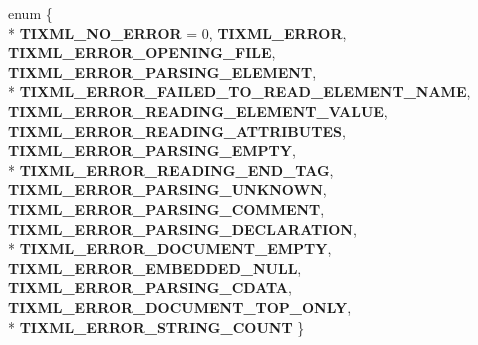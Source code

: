 \begin{DoxyCompactItemize}
\item 
\hypertarget{class_ti_xml_base_a86bc897e86b25d1a668fecef70be671c}{enum \{ \\*
{\bfseries T\+I\+X\+M\+L\+\_\+\+N\+O\+\_\+\+E\+R\+R\+O\+R} = 0, 
{\bfseries T\+I\+X\+M\+L\+\_\+\+E\+R\+R\+O\+R}, 
{\bfseries T\+I\+X\+M\+L\+\_\+\+E\+R\+R\+O\+R\+\_\+\+O\+P\+E\+N\+I\+N\+G\+\_\+\+F\+I\+L\+E}, 
{\bfseries T\+I\+X\+M\+L\+\_\+\+E\+R\+R\+O\+R\+\_\+\+P\+A\+R\+S\+I\+N\+G\+\_\+\+E\+L\+E\+M\+E\+N\+T}, 
\\*
{\bfseries T\+I\+X\+M\+L\+\_\+\+E\+R\+R\+O\+R\+\_\+\+F\+A\+I\+L\+E\+D\+\_\+\+T\+O\+\_\+\+R\+E\+A\+D\+\_\+\+E\+L\+E\+M\+E\+N\+T\+\_\+\+N\+A\+M\+E}, 
{\bfseries T\+I\+X\+M\+L\+\_\+\+E\+R\+R\+O\+R\+\_\+\+R\+E\+A\+D\+I\+N\+G\+\_\+\+E\+L\+E\+M\+E\+N\+T\+\_\+\+V\+A\+L\+U\+E}, 
{\bfseries T\+I\+X\+M\+L\+\_\+\+E\+R\+R\+O\+R\+\_\+\+R\+E\+A\+D\+I\+N\+G\+\_\+\+A\+T\+T\+R\+I\+B\+U\+T\+E\+S}, 
{\bfseries T\+I\+X\+M\+L\+\_\+\+E\+R\+R\+O\+R\+\_\+\+P\+A\+R\+S\+I\+N\+G\+\_\+\+E\+M\+P\+T\+Y}, 
\\*
{\bfseries T\+I\+X\+M\+L\+\_\+\+E\+R\+R\+O\+R\+\_\+\+R\+E\+A\+D\+I\+N\+G\+\_\+\+E\+N\+D\+\_\+\+T\+A\+G}, 
{\bfseries T\+I\+X\+M\+L\+\_\+\+E\+R\+R\+O\+R\+\_\+\+P\+A\+R\+S\+I\+N\+G\+\_\+\+U\+N\+K\+N\+O\+W\+N}, 
{\bfseries T\+I\+X\+M\+L\+\_\+\+E\+R\+R\+O\+R\+\_\+\+P\+A\+R\+S\+I\+N\+G\+\_\+\+C\+O\+M\+M\+E\+N\+T}, 
{\bfseries T\+I\+X\+M\+L\+\_\+\+E\+R\+R\+O\+R\+\_\+\+P\+A\+R\+S\+I\+N\+G\+\_\+\+D\+E\+C\+L\+A\+R\+A\+T\+I\+O\+N}, 
\\*
{\bfseries T\+I\+X\+M\+L\+\_\+\+E\+R\+R\+O\+R\+\_\+\+D\+O\+C\+U\+M\+E\+N\+T\+\_\+\+E\+M\+P\+T\+Y}, 
{\bfseries T\+I\+X\+M\+L\+\_\+\+E\+R\+R\+O\+R\+\_\+\+E\+M\+B\+E\+D\+D\+E\+D\+\_\+\+N\+U\+L\+L}, 
{\bfseries T\+I\+X\+M\+L\+\_\+\+E\+R\+R\+O\+R\+\_\+\+P\+A\+R\+S\+I\+N\+G\+\_\+\+C\+D\+A\+T\+A}, 
{\bfseries T\+I\+X\+M\+L\+\_\+\+E\+R\+R\+O\+R\+\_\+\+D\+O\+C\+U\+M\+E\+N\+T\+\_\+\+T\+O\+P\+\_\+\+O\+N\+L\+Y}, 
\\*
{\bfseries T\+I\+X\+M\+L\+\_\+\+E\+R\+R\+O\+R\+\_\+\+S\+T\+R\+I\+N\+G\+\_\+\+C\+O\+U\+N\+T}
 \}}\label{class_ti_xml_base_a86bc897e86b25d1a668fecef70be671c}

\end{DoxyCompactItemize}
